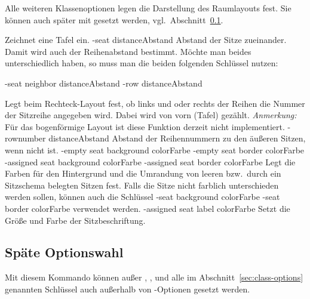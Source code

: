 \documentclass[
babel-options={ngerman},
load-preamble-,
scrartcl={headings=small}
]{cnltx-doc}
\begin{document}
Alle weiteren Klassenoptionen legen die Darstellung des Raumlayouts fest.
Sie können auch später mit  gesetzt werden, vgl.\ Abschnitt~\ref{sec:late-options}.
\begin{options}
  Zeichnet eine Tafel ein.
  \keyval-{seat distance}{Abstand}\Default{2pt}
  Abstand der Sitze zueinander. Damit wird auch der Reihenabstand bestimmt.
  Möchte man beides unterschiedlich haben, so muss man die beiden folgenden
  Schlüssel nutzen:
  
  \keyval-{seat neighbor distance}{Abstand}\Default*{2pt}\vspace{-.3\baselineskip}
  \keyval-{row distance}{Abstand}\Default{2pt}

  Legt beim Rechteck-Layout fest, ob links und oder rechts der Reihen die Nummer
  der Sitzreihe angegeben wird. Dabei wird von vorn (Tafel) gezählt.\newline
  \emph{Anmerkung:} Für das bogenförmige Layout ist diese Funktion derzeit
  nicht implementiert.
  \keyval-{rownumber distance}{Abstand}\Default{2pt}
  Abstand der Reihennummern zu den äußeren Sitzen, wenn 
  nicht  ist.
  \keyval-{empty seat background color}{Farbe}\vspace{-.3\baselineskip}
  \keyval-{empty seat border color}{Farbe}\vspace{-.3\baselineskip}
  \keyval-{assigned seat background color}{Farbe}\vspace{-.3\baselineskip}
  \keyval-{assigned seat border color}{Farbe}
  Legt die Farben für den Hintergrund und die Umrandung von leeren bzw.\ durch
  ein Sitzschema belegten Sitzen fest.
  Falls die Sitze nicht farblich unterschieden werden sollen, können auch die
  Schlüssel
  \keyval-{seat background color}{Farbe}\Default*\vspace{-.3\baselineskip}
  \keyval-{seat border color}{Farbe}\Default
  verwendet werden.
  \vspace{-.3\baselineskip}
  \keyval-{assigned seat label color}{Farbe}
  Setzt die Größe und Farbe der Sitzbeschriftung.
\end{options}
\subsection{Späte Optionswahl}
\label{sec:late-options}
\begin{commands}
  Mit diesem Kommando können außer
  , ,  und  alle
  im Abschnitt~\ref{sec:class-options} genannten Schlüssel auch
  außerhalb von -Optionen gesetzt werden.
\end{commands}
\end{document}
